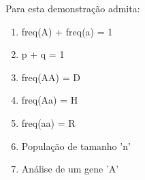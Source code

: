 \begin{definition}

Para esta demonstração admita:

\begin{enumerate}
\item freq(A) + freq(a) = 1
\item p + q = 1
\item freq(AA) = D
\item freq(Aa) = H
\item freq(aa) = R
\item População de tamanho 'n'
\item Análise de um gene 'A'
\end{enumerate}






\end{definition}